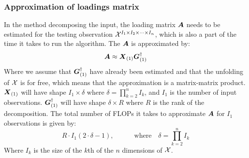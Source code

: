 \subsubsection{Approximation of loadings matrix}
In the method decomposing the input, the loading matrix $\boldsymbol{A}$ needs to be estimated for the testing observation $\mathcal{X}^{I_1 \times I_2 \times \dots \times I_n}$, which is also a part of the time it takes to run the algorithm. The $\boldsymbol{A}$ is approximated by:
\begin{equation}
    \boldsymbol{A} \approx \boldsymbol{X}_{(1)} \boldsymbol{G}_{(1)}^{\dagger}
    \label{eq:estimation_of_loading_A}
\end{equation}
Where we assume that $\boldsymbol{G}_{(1)}^{\dagger}$ have already been estimated and that the unfolding of $\mathcal{X}$ is for free, which means that the approximation is a matrix-matrix product. $\boldsymbol{X}_{(1)}$ will have shape $I_1 \times \delta$ where $\delta = \prod_{k=2}^n I_k$, and $I_1$ is the number of input observations. $\boldsymbol{G}_{(1)}^{\dagger}$ will have shape $\delta \times R$ where $R$ is the rank of the decomposition. The total number of FLOPs it takes to approximate $\boldsymbol{A}$ for $I_1$ observations is given by:
\begin{equation}
    R \cdot I_1 (2\cdot \delta - 1), \qquad \quad \text{where} \quad \delta = \prod_{k=2}^n I_k
\end{equation}
Where $I_k$ is the size of the $k$th of the $n$ dimensions of $\mathcal{X}$.